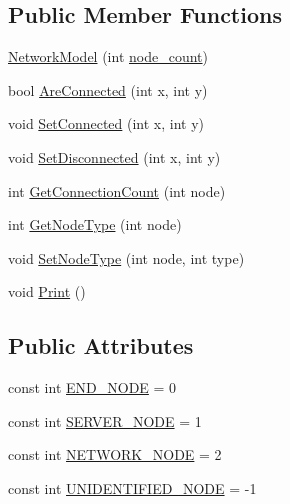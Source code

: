 \subsection*{Public Member Functions}
\begin{DoxyCompactItemize}
\item 
\hyperlink{classNetTrafficSimulator_1_1NetworkModel_a271752106d40e56f0f55def7f0e1bf0d}{Network\-Model} (int \hyperlink{classNetTrafficSimulator_1_1NetworkModel_a85f9941bb3af088bd078b273f0cb4e52}{node\-\_\-count})
\item 
bool \hyperlink{classNetTrafficSimulator_1_1NetworkModel_a5d2d13396e4df9e45146b8a7f02a9b67}{Are\-Connected} (int x, int y)
\item 
void \hyperlink{classNetTrafficSimulator_1_1NetworkModel_a9b2e702172bb308e9882de6e1f22e9f1}{Set\-Connected} (int x, int y)
\item 
void \hyperlink{classNetTrafficSimulator_1_1NetworkModel_acf61bc6091630b26455868a2575d34c7}{Set\-Disconnected} (int x, int y)
\item 
int \hyperlink{classNetTrafficSimulator_1_1NetworkModel_ae32e3d246753b51152124af9df9372ee}{Get\-Connection\-Count} (int node)
\item 
int \hyperlink{classNetTrafficSimulator_1_1NetworkModel_a3d8f3112c2cc4b21fe8070a0896652fa}{Get\-Node\-Type} (int node)
\item 
void \hyperlink{classNetTrafficSimulator_1_1NetworkModel_ac8457d8aa77448caa2212020f48eec20}{Set\-Node\-Type} (int node, int type)
\item 
void \hyperlink{classNetTrafficSimulator_1_1NetworkModel_a724d036cf0dbadefaba005aa853630be}{Print} ()
\end{DoxyCompactItemize}
\subsection*{Public Attributes}
\begin{DoxyCompactItemize}
\item 
const int \hyperlink{classNetTrafficSimulator_1_1NetworkModel_a1335e5ee160345ac2f849998d94f2934}{E\-N\-D\-\_\-\-N\-O\-D\-E} = 0
\item 
const int \hyperlink{classNetTrafficSimulator_1_1NetworkModel_a9f536ecef65ce9ef55b52afa90ae8438}{S\-E\-R\-V\-E\-R\-\_\-\-N\-O\-D\-E} = 1
\item 
const int \hyperlink{classNetTrafficSimulator_1_1NetworkModel_ab2882fa4fe981780f78f822b12677f88}{N\-E\-T\-W\-O\-R\-K\-\_\-\-N\-O\-D\-E} = 2
\item 
const int \hyperlink{classNetTrafficSimulator_1_1NetworkModel_a6736303b5919398aef63238c6436fe9c}{U\-N\-I\-D\-E\-N\-T\-I\-F\-I\-E\-D\-\_\-\-N\-O\-D\-E} = -\/1
\end{DoxyCompactItemize}
